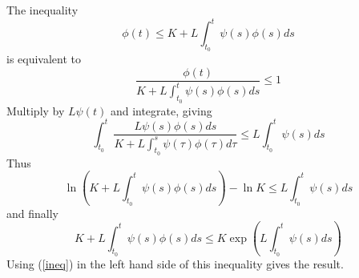\documentclass[12pt]{article}
\begin{document}
The inequality
\begin{equation}
\phi(t)\leq K+L\int_{t_0}^t\psi(s)\phi(s)ds
\label{ineq}
\end{equation}
is equivalent to
\[
\frac{\phi(t)}{K+L\int_{t_0}^t\psi(s)\phi(s)ds}\leq 1
\]
Multiply by $L\psi(t)$ and integrate, giving
\[
\int_{t_0}^t \frac{L\psi(s)\phi(s)ds}{K+L\int_{t_0}^s\psi(\tau)\phi(\tau)d\tau}\leq L\int_{t_0}^t \psi(s)ds
\]
Thus
\[
\ln\left(K+L\int_{t_0}^t\psi(s)\phi(s)ds\right)-\ln K\leq L\int_{t_0}^t \psi(s)ds
\]
and finally
\[
K+L\int_{t_0}^t\psi(s)\phi(s)ds\leq K\exp\left(L\int_{t_0}^t\psi(s)ds\right)
\]
Using (\ref{ineq}) in the left hand side of this inequality gives the result.
\end{document}
